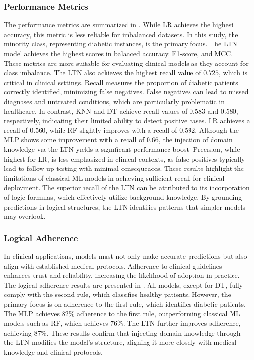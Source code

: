 \subsubsection{Performance Metrics}
\label{subsubsec:performance-metrics}
%

%
The performance metrics are summarized in .
%
While \gls{LR} achieves the highest accuracy, this metric is less reliable for imbalanced datasets.
%
In this study, the minority class, representing diabetic instances, is the primary focus.
%
The \gls{LTN} model achieves the highest scores in balanced accuracy, F1-score, and \gls{MCC}.
%
These metrics are more suitable for evaluating clinical models as they account for class imbalance.
%
The \gls{LTN} also achieves the highest recall value of \(0.725\), which is critical in clinical settings.
%
Recall measures the proportion of diabetic patients correctly identified, minimizing false negatives.
%
False negatives can lead to missed diagnoses and untreated conditions, which are particularly problematic in healthcare.
%
In contrast, \gls{KNN} and \gls{DT} achieve recall values of \(0.583\) and \(0.580\), respectively, indicating their limited ability to detect positive cases.
%
\gls{LR} achieves a recall of \(0.560\), while \gls{RF} slightly improves with a recall of \(0.592\).
%
Although the \gls{MLP} shows some improvement with a recall of \(0.66\), the injection of domain knowledge via the \gls{LTN} yields a significant performance boost.
%
Precision, while highest for \gls{LR}, is less emphasized in clinical contexts, as false positives typically lead to follow-up testing with minimal consequences.
%
These results highlight the limitations of classical \gls{ML} models in achieving sufficient recall for clinical deployment.
%
The superior recall of the \gls{LTN} can be attributed to its incorporation of logic formulas, which effectively utilize background knowledge.
%
By grounding predictions in logical structures, the \gls{LTN} identifies patterns that simpler models may overlook.

%
\subsubsection{Logical Adherence}
\label{subsubsec:logical-adherence}
%

%
In clinical applications, models must not only make accurate predictions but also align with established medical protocols.
%
Adherence to clinical guidelines enhances trust and reliability, increasing the likelihood of adoption in practice.
%
The logical adherence results are presented in .
%
All models, except for \gls{DT}, fully comply with the second rule, which classifies healthy patients.
%
However, the primary focus is on adherence to the first rule, which identifies diabetic patients.
%
The \gls{MLP} achieves \(82\%\) adherence to the first rule, outperforming classical \gls{ML} models such as \gls{RF}, which achieves \(76\%\).
%
The \gls{LTN} further improves adherence, achieving \(87\%\).
%
These results confirm that injecting domain knowledge through the \gls{LTN} modifies the model's structure, aligning it more closely with medical knowledge and clinical protocols.

